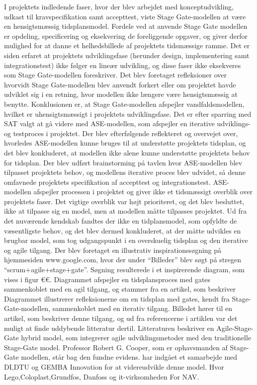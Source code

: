 	I projektets indledende faser, hvor der blev arbejdet med konceptudvikling, udkast til kravspecifikation samt accepttest, viste Stage Gate-modellen at være en hensigtsmæssig tidsplansmodel. Fordele ved at anvende Stage Gate modellen er opdeling, specificering og eksekvering de foreliggende opgaver, og giver derfor mulighed for at danne et helhedsbillede af projektets tidsmæssige ramme. Det er siden erfaret at projektets udviklingsfase (herunder design, implementering samt integrationstest) ikke følger en lineær udvikling, og disse faser ikke eksekveres som Stage Gate-modellen foreskriver. Det blev foretaget refleksioner over hvorvidt Stage Gate-modellen blev anvendt forkert eller om projektet havde udviklet sig i en retning, hvor modellen ikke længere være hensigtsmæssig at benytte. Konklusionen er, at Stage Gate-modellen afspejler vandfaldsmodellen, hvilket er uhensigtsmæssigt i projektets udviklingsfase. Det er efter sparring med SAT valgt at gå videre med ASE-modellen, som afspejler en iterative udviklings- og testproces i projektet. Der blev efterfølgende reflekteret og overvejet over, hvorledes ASE-modellen kunne bruges til at understøtte projektets tidsplan, og det blev konkluderet, at modellen ikke alene kunne understøtte projektets behov for tidsplan. Der blev udført brainstorming på tavlen hvor ASE-modellen blev tilpasset projektets behov, og modellens iterative proces blev udvidet, så denne omfavnede projektets specifikation af accepttest og integrationstest. ASE-modellen afspejler processen i projektet og giver ikke et tidsmæssigt overblik over projektets faser. Det vigtige overblik var højt prioriteret, og det blev besluttet, ikke at tilpasse sig en model, men at modellen måtte tilpasses projektet. Ud fra det nuværende kendskab fandtes der ikke en tidplansmodel, som opfyldte de væsentligste behov, og det blev dermed konkluderet, at der måtte udvikles en brugbar model, som tog udgangspunkt i en overskuelig tidsplan og den iterative og agile tilgang. Der blev foretaget en illustrativ inspirationssøgning på hjemmesiden www.google.com, hvor der under “Billeder” blev søgt på stregen “scrum+agile+stage+gate”. Søgning resulterede i et inspirerende diagram, som vises i figur €€. Diagrammet afspejler en tidsplansproces med gates sammenkoblet med en agil tilgang, og stammer fra en artikel, som beskriver   Diagrammet illustrerer refleksionerne om en tidsplan med gates, kendt fra Stage-Gate-modellen, sammenkoblet med en iterativ tilgang. Billedet hører til en artikel, som beskriver denne tilgang, og ud fra referencerne i artiklen var det muligt at finde uddybende litteratur dertil. Litteraturen beskriver en Agile-Stage-Gate hybrid model, som integrerer agile udviklingsmetoder med den traditionelle Stage-Gate model. Professor Robert G. Cooper, som er ophavsmanden af Stage-Gate modellen, står bag den fundne evidens.  
 har indgået et samarbejde med DI,DTU og GEMBA Innovation for at videreudvikle denne model. Hvor Lego,Coloplast,Grundfos, Danfoss og it-virksomheden For NAV. 




